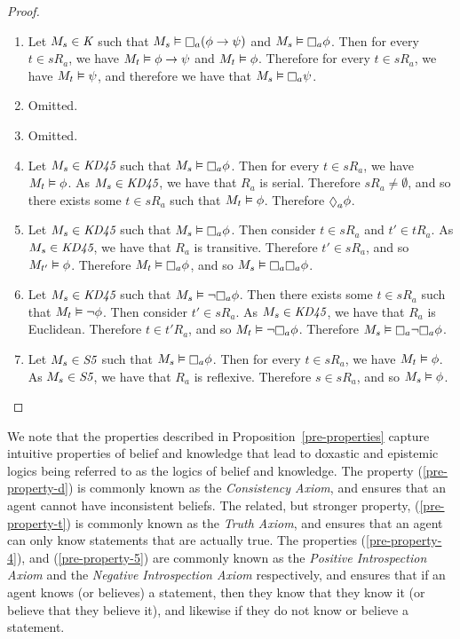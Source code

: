 \begin{proof}
\begin{enumerate}
\item Let $M_s \in \textit{K}{}$ such that $M_s \entails \knows_a (\phi \implies \psi)$
and $M_s \entails \knows_a \phi$. Then for every $t \in sR_a$, we have $M_t
\vDash \phi \rightarrow \psi$ and $M_t \vDash \phi$. Therefore for every $t \in sR_a$,
we have $M_t \vDash \psi$, and therefore we have that $M_s \entails \knows_a \psi$.
\item Omitted.
\item Omitted.
\item Let $M_s \in \textit{KD45}{}$ such that $M_s \entails \knows_a \phi$. Then for
every $t \in sR_a$, we have $M_t \vDash \phi$. As $M_s \in \textit{KD45}{}$, we have
that $R_a$ is serial. Therefore $sR_a \neq \emptyset$, and so there exists some
$t \in sR_a$ such that $M_t \vDash \phi$. Therefore $\suspects_a \phi$.
\item Let $M_s \in \textit{KD45}{}$ such that $M_s \entails \knows_a \phi$. Then
consider $t \in sR_a$ and $t' \in tR_a$. As $M_s \in \textit{KD45}{}$, we have that
$R_a$ is transitive. Therefore $t' \in sR_a$, and so $M_{t'} \vDash \phi$.
Therefore $M_t \entails \knows_a \phi$, and so $M_s \entails \knows_a \knows_a \phi$. 
\item Let $M_s \in \textit{KD45}{}$ such that $M_s \entails \neg \knows_a \phi$. Then
there exists some $t \in sR_a$ such that $M_t \vDash \neg \phi$. Then consider
$t' \in sR_a$. As $M_s \in \textit{KD45}{}$, we have that $R_a$ is Euclidean.
Therefore $t \in t'R_a$, and so $M_t \entails \neg \knows_a \phi$. Therefore $M_s
\entails \knows_a \neg \knows_a \phi$.
\item Let $M_s \in \textit{S5}{}$ such that $M_s \entails \knows_a \phi$. Then for
every $t \in sR_a$, we have $M_t \vDash \phi$. As $M_s \in \textit{S5}{}$, we have
that $R_a$ is reflexive. Therefore $s \in sR_a$, and so $M_s \vDash \phi$.
\end{enumerate}
\end{proof}

We note that the properties described in Proposition~\ref{pre-properties}
capture intuitive properties of belief and knowledge that lead to doxastic and
epistemic logics being referred to as the logics of belief and knowledge. The
property (\ref{pre-property-d}) is commonly known as the {\em Consistency
Axiom}, and ensures that an agent cannot have inconsistent beliefs.  The
related, but stronger property, (\ref{pre-property-t}) is commonly known as
the {\em Truth Axiom}, and ensures that an agent can only know statements that
are actually true. The properties (\ref{pre-property-4}), and
(\ref{pre-property-5}) are commonly known as the {\em Positive Introspection
Axiom} and the {\em Negative Introspection Axiom} respectively, and ensures that
if an agent knows (or believes) a statement, then they know that they know it
(or believe that they believe it), and likewise if they do not know or believe a
statement.

